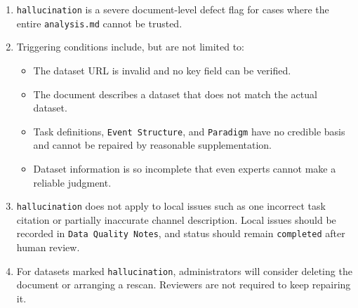 \begin{tcolorbox}
\begin{enumerate}[leftmargin=1.5em,noitemsep,topsep=2pt]
\item \texttt{hallucination} is a severe document-level defect flag for cases where the entire \texttt{analysis.md} cannot be trusted.
\item Triggering conditions include, but are not limited to:
\begin{itemize}[leftmargin=1.2em,noitemsep,topsep=1pt]
\item The dataset URL is invalid and no key field can be verified.
\item The document describes a dataset that does not match the actual dataset.
\item Task definitions, \texttt{Event Structure}, and \texttt{Paradigm} have no credible basis and cannot be repaired by reasonable supplementation.
\item Dataset information is so incomplete that even experts cannot make a reliable judgment.
\end{itemize}
\item \texttt{hallucination} does not apply to local issues such as one incorrect task citation or partially inaccurate channel description. Local issues should be recorded in \texttt{Data Quality Notes}, and status should remain \texttt{completed} after human review.
\item For datasets marked \texttt{hallucination}, administrators will consider deleting the document or arranging a rescan. Reviewers are not required to keep repairing it.
\end{enumerate}

\smallskip{}\par\smallskip


\end{tcolorbox}
